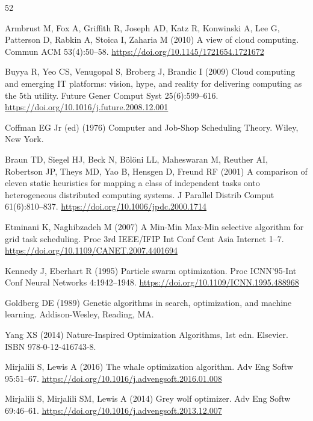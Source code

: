 \documentclass[pdflatex,onecolumn,sn-mathphys-num]{sn-jnl}
\begin{document}

\setlength{\bibsep}{0.65em}
\begin{thebibliography}{52}

Armbrust M, Fox A, Griffith R, Joseph AD, Katz R, Konwinski A, Lee G, Patterson D, Rabkin A, Stoica I, Zaharia M (2010) A view of cloud computing. Commun ACM 53(4):50--58. \url{https://doi.org/10.1145/1721654.1721672}

Buyya R, Yeo CS, Venugopal S, Broberg J, Brandic I (2009) Cloud computing and emerging IT platforms: vision, hype, and reality for delivering computing as the 5th utility. Future Gener Comput Syst 25(6):599--616. \url{https://doi.org/10.1016/j.future.2008.12.001}

Coffman EG Jr (ed) (1976) Computer and Job-Shop Scheduling Theory. Wiley, New York.

Braun TD, Siegel HJ, Beck N, B\"{o}l\"{o}ni LL, Maheswaran M, Reuther AI, Robertson JP, Theys MD, Yao B, Hensgen D, Freund RF (2001) A comparison of eleven static heuristics for mapping a class of independent tasks onto heterogeneous distributed computing systems. J Parallel Distrib Comput 61(6):810--837. \url{https://doi.org/10.1006/jpdc.2000.1714}

Etminani K, Naghibzadeh M (2007) A Min-Min Max-Min selective algorithm for grid task scheduling. Proc 3rd IEEE/IFIP Int Conf Cent Asia Internet 1--7. \url{https://doi.org/10.1109/CANET.2007.4401694}

Kennedy J, Eberhart R (1995) Particle swarm optimization. Proc ICNN'95-Int Conf Neural Networks 4:1942--1948. \url{https://doi.org/10.1109/ICNN.1995.488968}

Goldberg DE (1989) Genetic algorithms in search, optimization, and machine learning. Addison-Wesley, Reading, MA.

Yang XS (2014) Nature-Inspired Optimization Algorithms, 1st edn. Elsevier. ISBN 978-0-12-416743-8.

Mirjalili S, Lewis A (2016) The whale optimization algorithm. Adv Eng Softw 95:51--67. \url{https://doi.org/10.1016/j.advengsoft.2016.01.008}

Mirjalili S, Mirjalili SM, Lewis A (2014) Grey wolf optimizer. Adv Eng Softw 69:46--61. \url{https://doi.org/10.1016/j.advengsoft.2013.12.007}


\end{thebibliography}
\end{document}
